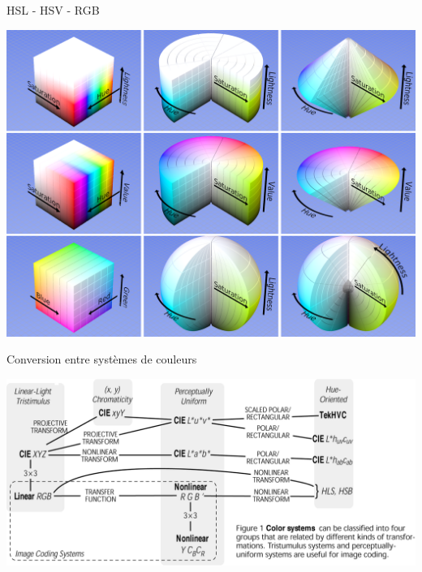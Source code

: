 \begin{frame}{HSL - HSV - RGB}
\begin{center}
\includegraphics[height=.8\textheight]{figs/hsvrgb.png}
\end{center}
\end{frame}

\begin{frame}{Conversion entre systèmes de couleurs}
\begin{center}
\includegraphics[height=.6\textheight]{figs/convcoul.png}
\end{center}
\end{frame}
